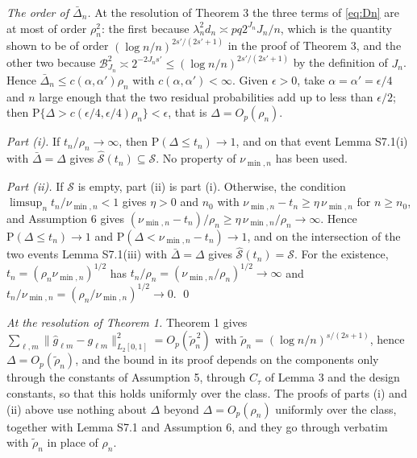 \documentclass[10pt]{book}
\theoremstyle{definition}
\newcommand{\Prob}{\mathrm{P}}
\newcommand{\cv}{\ell}
\newcommand{\md}{m}
\newcommand{\gcomp}[2]{g_{#1#2}}
\newcommand{\penn}{\lambda_{n}}
\newcommand{\seff}{s'}
\begin{document}
{\emph{The order of $\bar{\Delta}_n$.} At the resolution of Theorem 3 the three terms of
\eqref{eq:Dn} are at most of order $\rho_n^2$: the first because
$\penn^2d_n \asymp pq2^{J_n}J_n/n$, which is the quantity shown to be of order
$(\log n/n)^{2\seff/(2\seff+1)}$ in the proof of Theorem 3, and the other two
because $\mathcal{B}^2_{J_n} \asymp 2^{-2J_n\seff} \le
(\log n/n)^{2\seff/(2\seff+1)}$ by the definition of $J_n$. Hence
$\bar{\Delta}_n \le c(\alpha,\alpha')\rho_n$ with $c(\alpha,\alpha') < \infty$. Given $\epsilon > 0$,
take $\alpha = \alpha' = \epsilon/4$ and $n$ large enough that the two
residual probabilities add up to less than $\epsilon/2$; then
$\Prob\{\Delta > c(\epsilon/4,\epsilon/4)\rho_n\} < \epsilon$, that is
$\Delta = O_p(\rho_n)$.

\emph{Part (i).} If $t_n/\rho_n \to \infty$, then
$\Prob(\Delta \le t_n) \to 1$, and on that event Lemma S7.1(i) with
$\bar{\Delta} = \Delta$ gives $\widehat{\mathcal{S}}(t_n) \subseteq \mathcal{S}$. No property of $\nu_{\min,n}$
has been used.

\emph{Part (ii).} If $\mathcal{S}$ is empty, part (ii) is part (i). Otherwise, the
condition $\limsup_n t_n/\nu_{\min,n} < 1$ gives $\eta > 0$ and $n_0$ with
$\nu_{\min,n} - t_n \ge \eta\,\nu_{\min,n}$ for $n \ge n_0$, and Assumption 6 gives
$(\nu_{\min,n} - t_n)/\rho_n \ge \eta\,\nu_{\min,n}/\rho_n \to \infty$. Hence
$\Prob(\Delta \le t_n) \to 1$ and $\Prob(\Delta < \nu_{\min,n} - t_n) \to 1$, and
on the intersection of the two events Lemma S7.1(iii) with $\bar{\Delta} = \Delta$ gives
$\widehat{\mathcal{S}}(t_n) = \mathcal{S}$. For the existence, $t_n = (\rho_n\nu_{\min,n})^{1/2}$ has
$t_n/\rho_n = (\nu_{\min,n}/\rho_n)^{1/2} \to \infty$ and
$t_n/\nu_{\min,n} = (\rho_n/\nu_{\min,n})^{1/2} \to 0$. \qed

\textcolor{colR1}{\emph{At the resolution of Theorem 1.} Theorem 1 gives
$\sum_{\cv,\md}\lVert\widehat{g}_{\cv\md}-\gcomp{\cv}{\md}\rVert^2_{L_2[0,1]}
= O_p(\tilde\rho_n^{\,2})$ with $\tilde\rho_n = (\log n/n)^{s/(2s+1)}$, hence
$\Delta = O_p(\tilde\rho_n)$, and the bound in its proof depends on the
components only through the constants of Assumption 5, through $C_\tau$ of
Lemma 3 and the design constants, so that this holds uniformly over the
class. The proofs of parts (i) and (ii) above use nothing about $\Delta$
beyond $\Delta = O_p(\rho_n)$ uniformly over the class, together with
Lemma S7.1 and Assumption 6, and they go through verbatim with
$\tilde\rho_n$ in place of $\rho_n$.}
}

\bibhang=1.7pc
\bibsep=2pt
\fontsize{9}{14pt plus.8pt minus .6pt}\selectfont
\renewcommand\bibname{\large \bf References}


\end{document}
